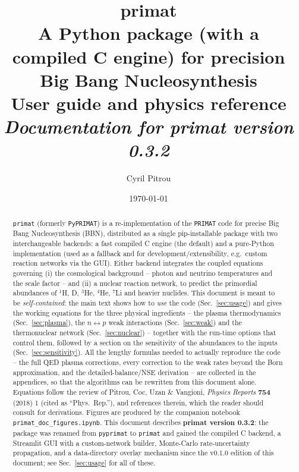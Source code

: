 \documentclass[11pt,a4paper]{article}
\title{\textbf{primat}\\[2pt]
       \large A Python package (with a compiled C engine) for precision Big
       Bang Nucleosynthesis\\[6pt]
       \normalsize User guide and physics reference\\[4pt]
       \normalsize\textit{Documentation for primat version 0.3.2}}
\author{Cyril Pitrou}
\date{\today}
\newcommand{\code}[1]{\texttt{#1}}
\newcommand{\PR}{Phys.\ Rep.}
\begin{document}
\maketitle

\begin{abstract}
\noindent
\code{primat} (formerly \code{PyPRIMAT}) is a re-implementation of the
\code{PRIMAT} code for precise Big Bang Nucleosynthesis (BBN), distributed as
a single pip-installable package with two interchangeable backends: a fast
compiled C engine (the default) and a pure-Python implementation (used as a
fallback and for development/extensibility, e.g.\ custom reaction networks
via the GUI). Either backend integrates the coupled equations governing
(i) the cosmological background -- photon and neutrino temperatures and the
scale factor -- and (ii) a nuclear reaction network, to predict the primordial
abundances of $^{1}$H, D, $^{3}$He, $^{4}$He, $^{7}$Li and heavier nuclides.
This document is meant to be \emph{self-contained}: the main text shows how to
\emph{use} the code (Sec.~\ref{sec:usage}) and gives the working equations for
the three physical ingredients -- the plasma thermodynamics
(Sec.~\ref{sec:plasma}), the $n\leftrightarrow p$ weak interactions
(Sec.~\ref{sec:weak}) and the thermonuclear network (Sec.~\ref{sec:nuclear}) --
together with the run-time options that control them, followed by a section on
the sensitivity of the abundances to the inputs (Sec.~\ref{sec:sensitivity}).
All the lengthy formulas needed to actually reproduce the code -- the full QED
plasma corrections, every correction to the weak rates beyond the Born
approximation, and the detailed-balance/NSE derivation -- are collected in the
appendices, so that the algorithms can be rewritten from this document alone.
Equations follow the review of Pitrou, Coc, Uzan \& Vangioni,
\emph{Physics Reports} \textbf{754} (2018) 1 \cite{PhysRep2018} (cited as
``\PR''), and references therein, which the reader should consult for
derivations.  Figures are produced by the companion notebook
\code{primat\_doc\_figures.ipynb}. This document describes \textbf{primat
version 0.3.2}: the package was renamed from \code{pyprimat} to \code{primat}
and gained the compiled C backend, a Streamlit GUI with a custom-network
builder, Monte-Carlo rate-uncertainty propagation, and a data-directory
overlay mechanism since the v0.1.0 edition of this document; see
Sec.~\ref{sec:usage} for all of these.
\end{abstract}

\tableofcontents
\end{document}
